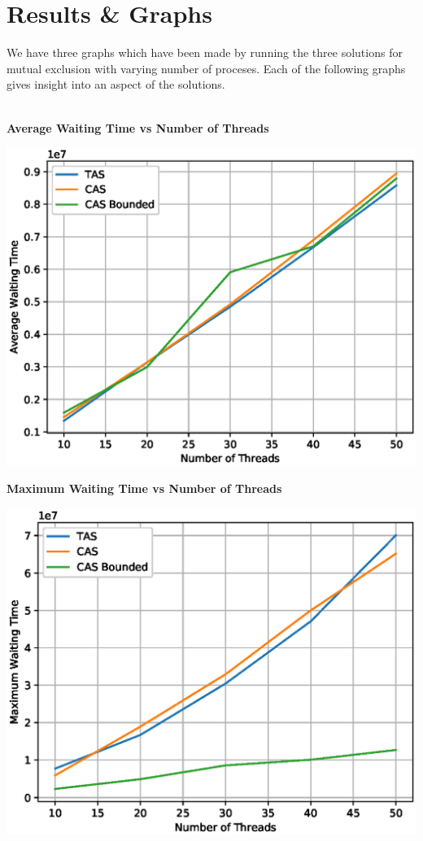 \documentclass[a4paper,12pt]{report}
\begin{document}
\section{Results \& Graphs}
We have three graphs which have been made by running the three solutions for mutual exclusion with varying number of proceses. Each of the following graphs gives insight into an aspect of the solutions.\\\\
\begin{center}
\begin{large}
\textbf{Average Waiting Time vs Number of Threads}
\end{large}
\includegraphics{avg.eps}
\end{center}
\begin{center}
\begin{large}
\textbf{Maximum Waiting Time vs Number of Threads}
\end{large}
\includegraphics{max.eps}
\end{center}
\end{document}
